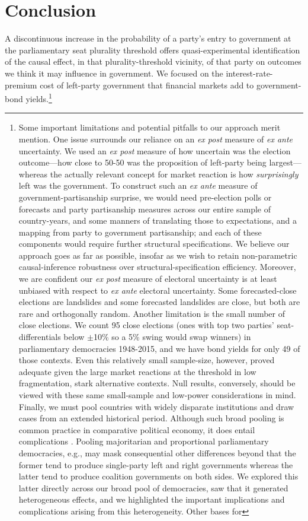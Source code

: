 \documentclass[12pt]{article}
\begin{document}
\section{Conclusion}

A discontinuous increase in the probability of a party's entry to government at the  parliamentary seat plurality threshold offers quasi-experimental identification of the causal effect, in that plurality-threshold vicinity, of that party on outcomes we think it may influence in government. We focused on the interest-rate-premium cost of left-party government that financial markets add to government-bond yields.\footnote{%
Some important limitations and potential pitfalls to our approach merit mention. One issue surrounds our reliance on an \textit{ex post} measure of \textit{ex ante} uncertainty. We used an \textit{ex post} measure of how uncertain was the election outcome---how close to 50-50 was the proposition of left-party being largest---whereas the actually relevant concept for market reaction is how \textit{surprisingly} left was the government. To construct such an \textit{ex ante} measure of government-partisanship surprise, we would need pre-election polls or forecasts and party partisanship measures across our entire sample of country-years, and some manners of translating those to expectations, and a mapping from party to government partisanship; and each of these components would require further structural specifications. We believe our approach goes as far as possible, insofar as we wish to retain non-parametric causal-inference robustness over structural-specification efficiency. Moreover, we are confident our \textit{ex post} measure of electoral uncertainty is at least unbiased with respect to \textit{ex ante} electoral uncertainty. Some forecasted-close elections are landslides and some forecasted landslides are close, but both are rare and orthogonally random. Another limitation is the small number of close elections. We count 95 close elections (ones with top two parties' seat-differentials below $\pm$10\% so a 5\% swing would swap winners) in parliamentary democracies 1948-2015, and we have bond yields for only 49 of those contexts. Even this relatively small sample-size, however, proved adequate given the large market reactions at the threshold in low fragmentation, stark alternative contexts. Null results, conversely, should be viewed with these same small-sample and low-power considerations in mind. Finally, we must pool countries with widely disparate institutions and draw cases from an extended historical period. Although such broad pooling is common practice in comparative political economy, it does entail complications \citep{Beck1995}. Pooling majoritarian and proportional parliamentary democracies, e.g., may mask consequential other differences beyond that the former tend to produce single-party left and right governments whereas the latter tend to produce coalition governments on both sides. We explored this latter directly across our broad pool of democracies, saw that it generated heterogeneous effects, and we highlighted the important implications and complications arising from this heterogeneity. Other bases for }
\end{document}
